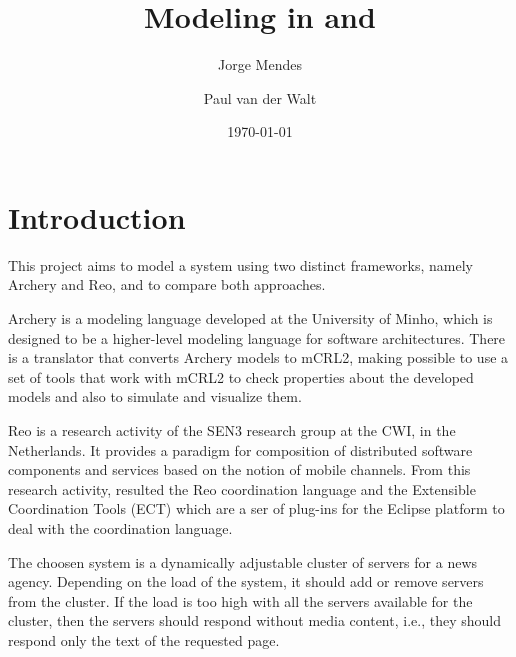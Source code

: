 \documentclass[a4paper]{article}
\author{Jorge Mendes \and Paul van der Walt}
\date{\today}
\title{Modeling in \ar and \re}
\newcommand{\ar}{Archery\xspace}
\newcommand{\re}{Reo\xspace}
\newcommand{\mcrl}{mCRL2\xspace}
\begin{document}
\maketitle

%
%
\section{Introduction}

This project aims to model a system using two distinct frameworks, namely \ar
and \re, and to compare both approaches.

\ar is a modeling language developed at the University of Minho, which is designed
to be a higher-level modeling language for software architectures. There is a translator
that converts \ar models to \mcrl, making possible to use a set of tools that work with
\mcrl to check properties about the developed models and also to simulate and visualize them.

\re is a research activity of the SEN3 research group at the CWI, in the
Netherlands. It provides a paradigm for composition of distributed software
components and services based on the notion of mobile channels.
From this research activity, resulted the \re coordination language and the
Extensible Coordination Tools (ECT) which are a ser of plug-ins for the Eclipse
platform to deal with the coordination language.

The choosen system is a dynamically adjustable cluster of servers for a news
agency. Depending on the load of the system, it should add or remove servers
from the cluster. If the load is too high with all the servers available for
the cluster, then the servers should respond without media content, i.e., they
should respond only the text of the requested page.

%
%
%
\end{document}
